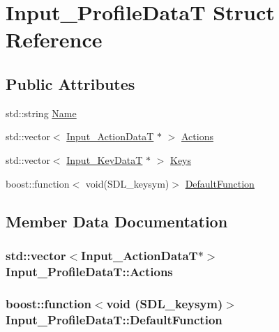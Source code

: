 \hypertarget{struct_input___profile_data_t}{
\section{Input\_\-ProfileDataT Struct Reference}
\label{struct_input___profile_data_t}
}
\subsection*{Public Attributes}
\begin{CompactItemize}
\item 
std::string \hyperlink{struct_input___profile_data_t_6732c71f6a7bed7d41854c1371de4acc}{Name}
\item 
std::vector$<$ \hyperlink{struct_input___action_data_t}{Input\_\-ActionDataT} $\ast$ $>$ \hyperlink{struct_input___profile_data_t_0a4f1221e3cf0a962ae9dcfed75f56f3}{Actions}
\item 
std::vector$<$ \hyperlink{struct_input___key_data_t}{Input\_\-KeyDataT} $\ast$ $>$ \hyperlink{struct_input___profile_data_t_d8c4669979c3a47f8bb1dbe58289fb87}{Keys}
\item 
boost::function$<$ void(SDL\_\-keysym)$>$ \hyperlink{struct_input___profile_data_t_72dea46fe304169b6c7963e23b4cb7ba}{DefaultFunction}
\end{CompactItemize}


\subsection{Member Data Documentation}
\hypertarget{struct_input___profile_data_t_0a4f1221e3cf0a962ae9dcfed75f56f3}{
\subsubsection[{Actions}]{\setlength{\rightskip}{0pt plus 5cm}std::vector$<${\bf Input\_\-ActionDataT}$\ast$$>$ {\bf Input\_\-ProfileDataT::Actions}}}
\label{struct_input___profile_data_t_0a4f1221e3cf0a962ae9dcfed75f56f3}


\hypertarget{struct_input___profile_data_t_72dea46fe304169b6c7963e23b4cb7ba}{
\subsubsection[{DefaultFunction}]{\setlength{\rightskip}{0pt plus 5cm}boost::function$<$void (SDL\_\-keysym)$>$ {\bf Input\_\-ProfileDataT::DefaultFunction}}}
\label{struct_input___profile_data_t_72dea46fe304169b6c7963e23b4cb7ba}


